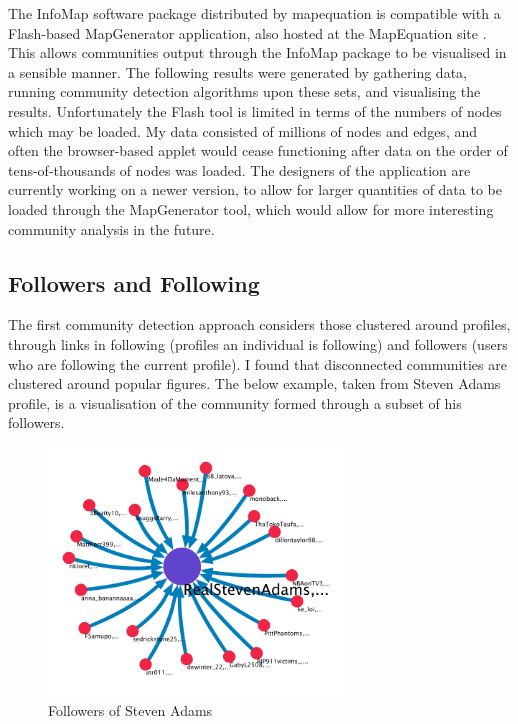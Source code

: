 The InfoMap software package distributed by mapequation is compatible with a Flash-based MapGenerator application, also hosted at the MapEquation site \cite{}. This allows communities output through the InfoMap package to be visualised in a sensible manner. The following results were generated by gathering data, running community detection algorithms upon these sets, and visualising the results. Unfortunately the Flash tool is limited in terms of the numbers of nodes which may be loaded. My data consisted of millions of nodes and edges, and often the browser-based applet would cease functioning after data on the order of tens-of-thousands of nodes was loaded. The designers of the application are currently working on a newer version, to allow for larger quantities of data to be loaded through the MapGenerator tool, which would allow for more interesting community analysis in the future. 

\subsection{Followers and Following}

The first community detection approach considers those clustered around profiles, through links in following (profiles an individual is following) and followers (users who are following the current profile). I found that disconnected communities are clustered around popular figures. The below example, taken from Steven Adams profile, is a visualisation of the community formed through a subset of his followers. 

\begin{figure}[h!]
\begin{center}
\centering
\includegraphics[width=300px]{Images/steven_adams_followers.pdf}
\caption{Followers of Steven Adams}
\end{center}
\end{figure}

